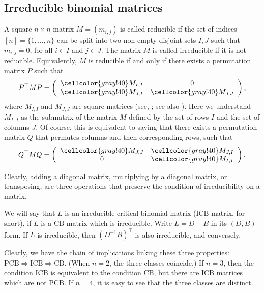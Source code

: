 \documentclass[ALCO]{cedram}
\newcommand{\y}{\cellcolor{gray!40}}
\newcommand{\icb}{\mbox{$\mathrm{ICB}$}}
\newcommand{\pcb}{\mbox{$\mathrm{PCB}$}}
\newcommand{\cb}{\mbox{$\mathrm{CB}$}}
\begin{document}
\subsection{Irreducible binomial matrices}\label{ibm}

 A square $n\times n$ matrix $M=(m_{i,j})$ is called
reducible if the set of indices $[n]=\{1,\ldots ,n\}$ can be split
into two non-empty disjoint sets $I,J$ such that $m_{i,j}=0$, for all
$i\in I$ and $j\in J$. The matrix $M$ is called irreducible if it is
not reducible. Equivalently, $M$ is reducible if and only if there
exists a permutation matrix $P$ such that
\begin{eqnarray}\label{reducedform}
P^{\top}MP=\left(\begin{array}{cc}\cellcolor{gray!40} M_{I,I}&0\\
\cellcolor{gray!40} M_{J,I}&\cellcolor{gray!40} M_{J,J}\end{array}\right),
\end{eqnarray}
where $M_{I,I}$ and $M_{J,J}$ are square matrices (see, \eg
\cite[Chapter~XIII, p.50]{gantmacher}; see also \cite[\S~3.2]{br}).
Here we understand $M_{I,J}$ as the submatrix of the matrix $M$
defined by the set of rows $I$ and the set of columns $J$.  Of course,
this is equivalent to saying that there exists a permutation matrix
$Q$ that permutes columns and then corresponding rows, such that
\begin{eqnarray*}
Q^{\top}MQ=\left(\begin{array}{cc}
\y M_{J,J}&\y M_{J,I}\\0&\y M_{I,I}\end{array}\right).
\end{eqnarray*}

Clearly, adding a diagonal matrix, multiplying by a diagonal matrix,
or transposing, are three operations that preserve the condition of
irreducibility on a matrix.

We will say that $L$ is an irreducible critical binomial matrix
($\icb$ matrix, for short), if $L$ is a $\cb$ matrix which is
irreducible. Write $L=D-B$ in its $(D,B)$ form. If $L$ is irreducible,
then $(D^{-1}B)^{\top}$ is also irreducible, and conversely.

Clearly, we have the chain of implications linking these three
properties: $\pcb\Rightarrow\icb\Rightarrow\cb$. (When $n=2$, the
three classes coincide.) If $n=3$, then the condition $\icb$ is
equivalent to the condition $\cb$, but there are $\icb$ matrices which
are not $\pcb$. If $n=4$, it is easy to see that the three classes are
distinct.
\end{document}
